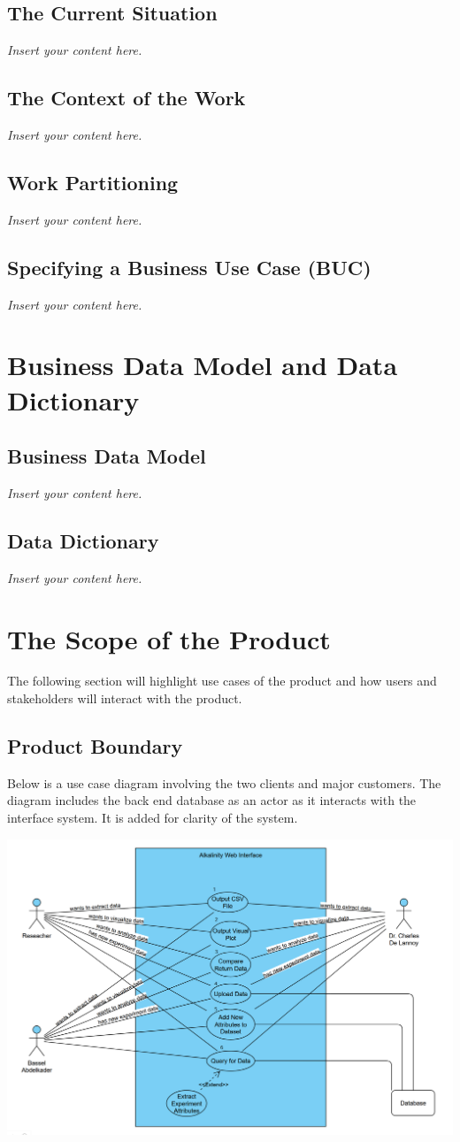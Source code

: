 \documentclass[12pt]{article}
\newcommand{\lips}{\textit{Insert your content here.}}
\begin{document}
\subsection{The Current Situation}
\lips
\subsection{The Context of the Work}
\lips
\subsection{Work Partitioning}
\lips
\subsection{Specifying a Business Use Case (BUC)}
\lips

\section{Business Data Model and Data Dictionary}
\subsection{Business Data Model}
\lips
\subsection{Data Dictionary}
\lips

\section{The Scope of the Product}
The following section will highlight use cases of the product and how users and
stakeholders will interact with the product.  
\subsection{Product Boundary}
Below is a use case diagram involving the two clients and major customers. The
diagram includes the back end database as an actor as it interacts with the
interface system. It is added for clarity of the system.
\begin{center}
  \includegraphics[scale=0.35]{capstoneUseCase.png}
\end{center}
\end{document}
